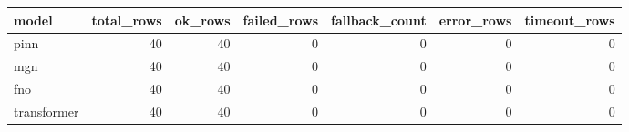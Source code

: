 \begin{tabular}{lrrrrrr}
\toprule
model & total\_rows & ok\_rows & failed\_rows & fallback\_count & error\_rows & timeout\_rows \\
\midrule
pinn & 40 & 40 & 0 & 0 & 0 & 0 \\
mgn & 40 & 40 & 0 & 0 & 0 & 0 \\
fno & 40 & 40 & 0 & 0 & 0 & 0 \\
transformer & 40 & 40 & 0 & 0 & 0 & 0 \\
\bottomrule
\end{tabular}
